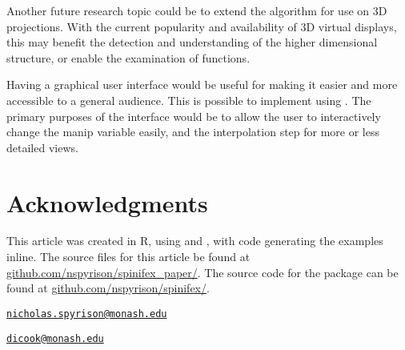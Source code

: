 Another future research topic could be to extend the algorithm for use
on 3D projections. With the current popularity and availability of 3D
virtual displays, this may benefit the detection and understanding of
the higher dimensional structure, or enable the examination of
functions.

Having a graphical user interface would be useful for making it easier
and more accessible to a general audience. This is possible to implement
using  \citep{chang_shiny_2020}. The primary purposes of
the interface would be to allow the user to interactively change the
manip variable easily, and the interpolation step for more or less
detailed views.

\hypertarget{acknowledgments}{%
\section{Acknowledgments}\label{acknowledgments}}

This article was created in R, using 
\citep{xie_knitr_2020} and 
\citep{allaire_rmarkdown_2020}, with code generating the examples
inline. The source files for this article be found at
\href{https://github.com/nspyrison/spinifex_paper/}{github.com/nspyrison/spinifex\_paper/}.
The source code for the  package can be found at
\href{https://github.com/nspyrison/spinifex/}{github.com/nspyrison/spinifex/}.



\address{%
Nicholas Spyrison\\
Monash University\\
Faculty of Information Technology\\
}
\href{mailto:nicholas.spyrison@monash.edu}{\nolinkurl{nicholas.spyrison@monash.edu}}

\address{%
Dianne Cook\\
Monash University\\
Department of Econometrics and Business Statistics\\
}
\href{mailto:dicook@monash.edu}{\nolinkurl{dicook@monash.edu}}

